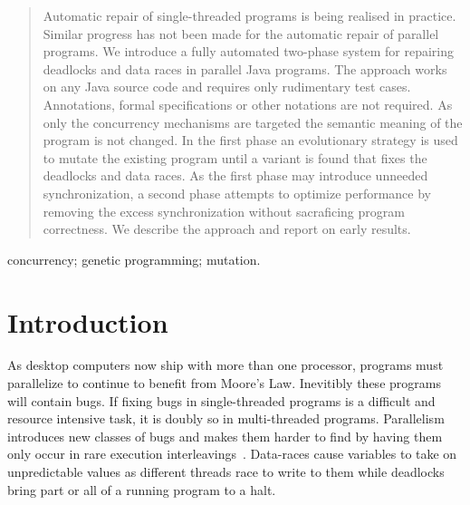 \documentclass[10pt, conference, compsocconf]{IEEEtran}
\begin{document}
\begin{abstract}

Automatic repair of single-threaded programs is being realised in practice.
Similar progress has not been made for the automatic repair of parallel
programs.  We introduce a fully automated two-phase system for repairing
deadlocks and data races in parallel Java programs. The approach works on any
Java source code and requires only rudimentary test cases. Annotations, formal
specifications or other notations are not required. As only the concurrency
mechanisms are targeted the semantic meaning of the program is not changed. In
the first phase an evolutionary strategy is used to mutate the existing program
until a variant is found that fixes the deadlocks and data races. As the first
phase may introduce unneeded synchronization, a second phase attempts to
optimize performance by removing the excess synchronization without sacraficing
program correctness. We describe the approach and report on early results.

\end{abstract}

\begin{IEEEkeywords}
concurrency; genetic programming; mutation.

\end{IEEEkeywords}


%
\IEEEpeerreviewmaketitle



\section{Introduction}
\label{sec:introduction}

As desktop computers now ship with more than one processor, programs must
parallelize to continue to benefit from Moore's Law. Inevitibly these programs
will contain bugs. If fixing bugs in single-threaded programs is a difficult
and resource intensive task,  it is doubly so in multi-threaded programs.
Parallelism~\cite{SL05} introduces new classes of bugs and makes them harder to
find by having them only occur in rare execution interleavings~\cite{MQB07}.
Data-races cause variables to take on unpredictable values as different threads
race to write to them while deadlocks bring part or all of a running program to
a halt.
\end{document}
